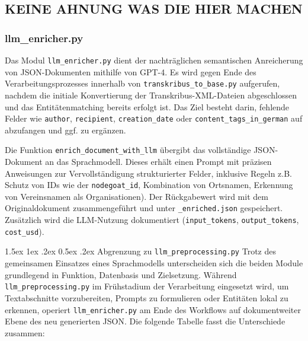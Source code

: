 \documentclass[12pt, a4paper, ngerman, bidi=default]{article}
\makeatletter
\newcommand{\code}[1]{\colorbox{VeryLightGray}{\texttt{#1}}} %
\let\oldparagraph\paragraph%
\renewcommand{\paragraph}{
    \@ifstar%
      \xxxParagraphStar%
      \xxxParagraphNoStar%
 }
\newcommand{\xxxParagraphStar}[1]{\oldparagraph*{#1}\mbox{}}
\newcommand{\xxxParagraphNoStar}[1]{\oldparagraph{#1}\mbox{}}
\renewcommand\paragraph{\@startsection{paragraph}{4}{0em}%
  {1.5ex \@plus1ex \@minus.2ex}%
  {0.5ex \@plus.2ex}%
  {\normalfont\normalsize\bfseries\itshape}}
\makeatother
\begin{document}
\subsection{KEINE AHNUNG WAS DIE HIER MACHEN}

\subsubsection{llm\_enricher.py}\label{subsection:llm_enricher}

Das Modul \code{llm\_enricher.py} dient der nachträglichen semantischen Anreicherung von JSON-Dokumenten mithilfe von GPT-4. Es wird gegen Ende des Verarbeitungsprozesses innerhalb von \code{transkribus\_to\_base.py} aufgerufen, nachdem die initiale Konvertierung der Transkribus-XML-Dateien abgeschlossen und das Entitätenmatching bereits erfolgt ist. Das Ziel besteht darin, fehlende Felder wie \code{author}, \code{recipient}, \code{creation\_date} oder \code{content\_tags\_in\_german} auf abzufangen und ggf. zu ergänzen.

Die Funktion \code{enrich\_document\_with\_llm} übergibt das vollständige JSON-Dokument an das Sprachmodell. Dieses erhält einen Prompt mit präzisen Anweisungen zur Vervollständigung strukturierter Felder, inklusive Regeln z.B. Schutz von IDs wie der \code{nodegoat\_id}, Kombination von Ortsnamen, Erkennung von Vereinsnamen als Organisationen). Der Rückgabewert wird mit dem Originaldokument zusammengeführt und unter \code{\_enriched.json} gespeichert. Zusätzlich wird die LLM-Nutzung dokumentiert (\code{input\_tokens}, \code{output\_tokens}, \code{cost\_usd}).

\paragraph{Abgrenzung zu \code{llm\_preprocessing.py}}%
Trotz des gemeinsamen Einsatzes eines Sprachmodells unterscheiden sich die beiden Module grundlegend in Funktion, Datenbasis und Zielsetzung. Während \code{llm\_preprocessing.py} im Frühstadium der Verarbeitung eingesetzt wird, um Textabschnitte vorzubereiten, Prompts zu formulieren oder Entitäten lokal zu erkennen, operiert \code{llm\_enricher.py} am Ende des Workflows auf dokumentweiter Ebene des neu generierten JSON. Die folgende Tabelle fasst die Unterschiede zusammen:
\end{document}
